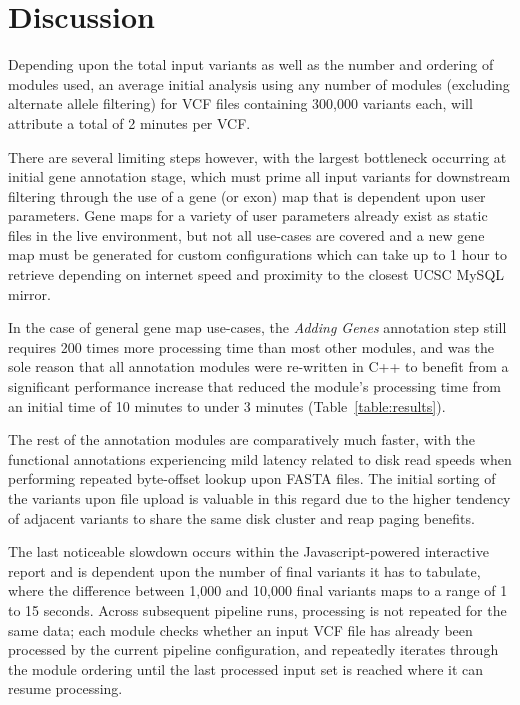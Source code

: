 \documentclass{bioinfo}
\begin{document}
\vspace{-1cm}
\section{Discussion}

Depending upon the total input variants as well as the number and ordering of modules used, an average initial analysis using any number of modules (excluding alternate allele filtering) for VCF files containing 300,000 variants each, will attribute a total of 2 minutes per VCF.

There are several limiting steps however, with the largest bottleneck occurring at initial gene annotation stage, which must prime all input variants for downstream filtering through the use of a gene (or exon) map that is dependent upon user parameters. Gene maps for a variety of user parameters already exist as static files in the live environment, but not all use-cases are covered and a new gene map must be generated for custom configurations which can take up to 1 hour to retrieve depending on internet speed and proximity to the closest UCSC MySQL mirror.

In the case of general gene map use-cases, the \textit{Adding Genes} annotation step still requires 200 times more processing time than most other modules, and was the sole reason that all annotation modules were re-written in C++ to benefit from a significant performance increase that reduced the module's processing time from an initial time of 10 minutes to under 3 minutes (Table~\ref{table:results}). 

The rest of the annotation modules are comparatively much faster, with the functional annotations experiencing mild latency related to disk read speeds when performing repeated byte-offset lookup upon FASTA files. The initial sorting of the variants upon file upload is valuable in this regard due to the higher tendency of adjacent variants to share the same disk cluster and reap paging benefits.

The last noticeable slowdown occurs within the Javascript-powered interactive report and is dependent upon the number of final variants it has to tabulate, where the difference between 1,000 and 10,000 final variants maps to a range of 1 to 15 seconds. Across subsequent pipeline runs, processing is not repeated for the same data; each module checks whether an input VCF file has already been processed by the current pipeline configuration, and repeatedly iterates through the module ordering until the last processed input set is reached where it can resume processing.
\end{document}
